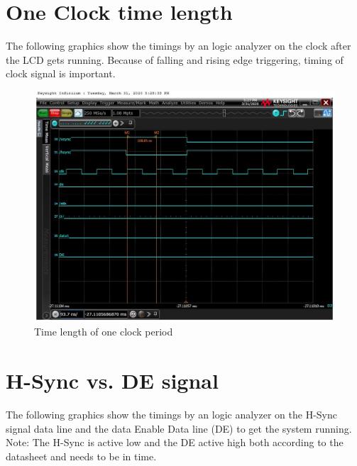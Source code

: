 \pagebreak
\section{One Clock time length}%
The following graphics show the timings by an logic analyzer on the clock
after the LCD gets running. Because of falling and rising edge triggering,
timing of clock signal is important.
\label{sub:clock_time_length}
\begin{figure}[h!]
\begin{center}
    \includegraphics[width=14cm]{pictures/lcd_timings/periode_time_1clk.jpg}
\end{center}
\caption{Time length of one clock period}
\label{fig:one_clock_time}
\end{figure}


\pagebreak
\section{H-Sync vs. DE signal}%
\label{sub:other_measured_lcd_timings}
The following graphics show the timings by an logic analyzer on the H-Sync
signal data line and the data Enable Data line (DE) to get the system
running. Note: The H-Sync is active low and the DE active high both according to
the datasheet and needs to be in time.

